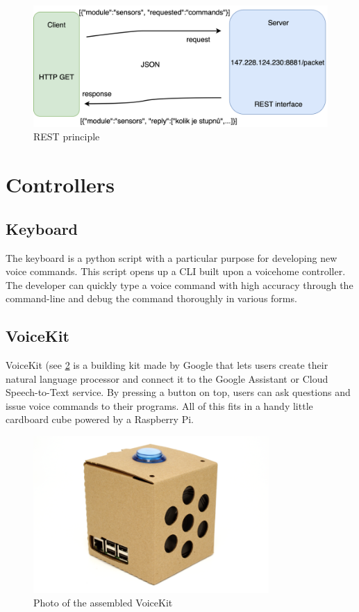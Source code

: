 \begin{figure}[H]
  \centering
  \includegraphics[width=\textwidth]{img/REST_schema.png}
  \caption{REST principle}
  \label{fig:REST_schema}
\end{figure}

\section{Controllers}

\subsection{Keyboard}

The keyboard is a python script with a particular purpose for developing new voice commands. This script opens up a CLI built upon a voicehome controller. The developer can quickly type a voice command with high accuracy through the command-line and debug the command thoroughly in various forms.

\subsection{VoiceKit}

VoiceKit (see \cref{fig:voicekit_photo} is a building kit made by Google \citep{aiy_projects} that lets users create their natural language processor and connect it to the Google Assistant or Cloud Speech-to-Text service. By pressing a button on top, users can ask questions and issue voice commands to their programs. All of this fits in a handy little cardboard cube powered by a Raspberry Pi.

\begin{figure}[H]
	\centering
	\includegraphics[width=0.8\textwidth]{img/voicekit_photo.png}
	\caption{Photo of the assembled VoiceKit \citep{wiki:voicekit_photo}}
	\label{fig:voicekit_photo}
\end{figure}


